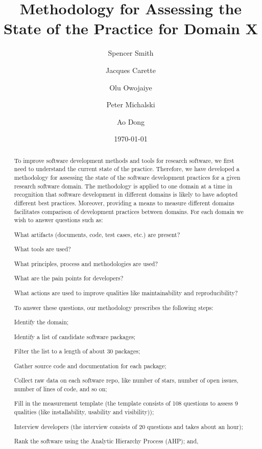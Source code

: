 \documentclass[letterpaper,cleveref]{lipics-v2019}
\title{Methodology for Assessing the State of the Practice for Domain X}
\author{Spencer Smith}{McMaster University, Canada}{smiths@mcmaster.ca}{}{}
\author{Jacques Carette}{McMaster University, Canada}{carette@mcmaster.ca}{}{}
\author{Olu Owojaiye}{McMaster University, Canada}{owojaiyo@mcmaster.ca}{}{}
\author{Peter Michalski}{McMaster University, Canada}{michap@mcmaster.ca}{}{}
\author{Ao Dong}{McMaster University, Canada}{donga9@mcmaster.ca}{}{}
\date{\today}
\begin{document}
\maketitle

\begin{abstract}
	To improve software development methods and tools for research software, we
	first need to understand the current state of the practice.  Therefore, we
	have developed a methodology for assessing the state of the software
	development practices for a given research software domain.  The methodology
	is applied to one domain at a time in recognition that software development in
	different domains is likely to have adopted different best practices.
	Moreover, providing a means to measure different domains facilitates
	comparison of development practices between domains.  For each domain we wish
	to answer questions such as: 
  \begin{inparaenum}[i)]
    \item What artifacts (documents, code, test cases, etc.) are present?
    \item What tools are used?
    \item What principles, process and methodologies are used?
    \item What are the pain points for developers?
    \item What actions are used to improve qualities like maintainability and
    reproducibility?
  \end{inparaenum} 
  To answer these questions, our methodology prescribes the following steps: 
  \begin{inparaenum}[i)] 
    \item Identify the domain;
    \item Identify a list of candidate software packages;
    \item Filter the list to a length of about 30 packages;
    \item Gather source code and documentation for each package;
    \item Collect raw data on each software repo, like number of stars, number
    of open issues, number of lines of code, and so on;
    \item Fill in the measurement template (the template consists of 108 questions
    to assess 9 qualities (like installability, usability and visibility));
    \item Interview developers (the interview consists of 20 questions and takes
    about an hour);
    \item Rank the software using the Analytic Hierarchy Process (AHP); and,

\end{inparaenum}
\end{abstract}
\end{document}
